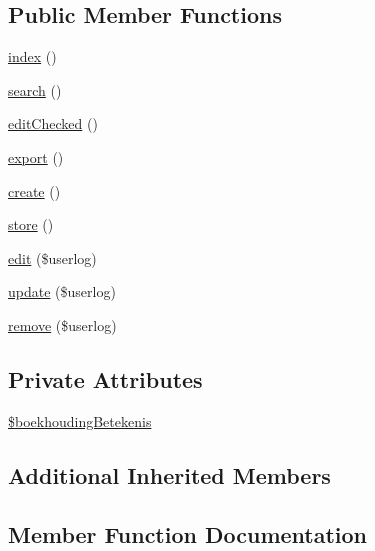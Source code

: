 \subsection*{Public Member Functions}
\begin{DoxyCompactItemize}
\item 
\hyperlink{class_staff_user_log_controller_a149eb92716c1084a935e04a8d95f7347}{index} ()
\item 
\hyperlink{class_staff_user_log_controller_a796bf438724e047aeef18579732a3780}{search} ()
\item 
\hyperlink{class_staff_user_log_controller_ae877726b3e657295d4288a3d39dd9051}{edit\+Checked} ()
\item 
\hyperlink{class_staff_user_log_controller_a06412eb3b5af8cd7d978ac6eab667fbf}{export} ()
\item 
\hyperlink{class_staff_user_log_controller_a435e7d7525d4bcd0ed5e34a469f3adf6}{create} ()
\item 
\hyperlink{class_staff_user_log_controller_a98e4b7b7529a9a5f6d7e96909cba8bfe}{store} ()
\item 
\hyperlink{class_staff_user_log_controller_a1c9232e3715dbf900cc60ded904dd715}{edit} (\$userlog)
\item 
\hyperlink{class_staff_user_log_controller_a67dc7adccd7766980fc01fe0a362679a}{update} (\$userlog)
\item 
\hyperlink{class_staff_user_log_controller_a2ef265b8eab708da3e81eedbb4de1f63}{remove} (\$userlog)
\end{DoxyCompactItemize}
\subsection*{Private Attributes}
\begin{DoxyCompactItemize}
\item 
\hyperlink{class_staff_user_log_controller_a316ac7370859d57c82f453d53561648b}{\$boekhouding\+Betekenis}
\end{DoxyCompactItemize}
\subsection*{Additional Inherited Members}


\subsection{Member Function Documentation}
\hypertarget{class_staff_user_log_controller_a435e7d7525d4bcd0ed5e34a469f3adf6}{}
